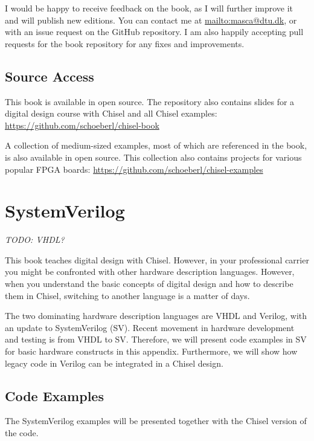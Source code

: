 \documentclass[%
    10pt,
    headinclude, footexclude,
    openright, %
    notitlepage,
    cleardoubleempty,
    headsepline,
    pointlessnumbers,
    bibtotoc, idxtotoc,
    ]{scrbook}
\newcommand{\todo}[1]{{\emph{TODO: #1}}}
\begin{document}
I would be happy to receive feedback on the book, as I will further
improve it and will publish new editions. You can contact me at
\url{mailto:masca@dtu.dk}, or with an issue request on the GitHub
repository. I am also happily accepting pull requests
for the book repository for any fixes and improvements.

\section*{Source Access}

This book is available in open source.
The repository also contains slides for a digital design course with Chisel and
all Chisel examples: \url{https://github.com/schoeberl/chisel-book}

A collection of medium-sized examples, most of which are referenced
in the book, is also available in open source. This collection
also contains projects for various popular FPGA boards:
\url{https://github.com/schoeberl/chisel-examples}

\appendix

\chapter{SystemVerilog}


\todo{VHDL?}

This book teaches digital design with Chisel. However, in your professional carrier you
might be confronted with other hardware description languages. However, when you
understand the basic concepts of digital design and how to describe them in Chisel,
switching to another language is a matter of days.

The two dominating hardware description languages are
VHDL and Verilog, with an update to SystemVerilog (SV). Recent movement
in hardware development and testing is from VHDL to SV. Therefore, we will present code
examples in SV for basic hardware constructs in this appendix.
Furthermore, we will show how legacy code in Verilog can be integrated
in a Chisel design.

\section{Code Examples}

The SystemVerilog examples will be presented together with the Chisel version
of the code.

\end{document}
